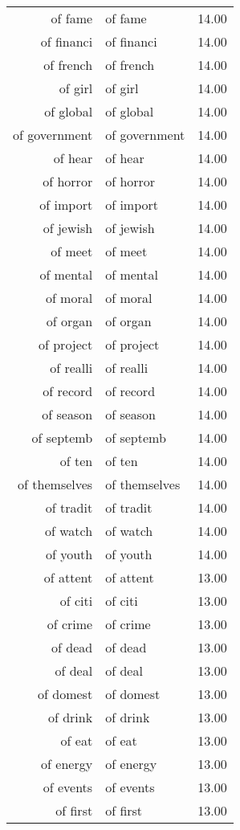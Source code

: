 \begin{table}[ht]
\begin{tabular}{rlr}
  of fame & of fame & 14.00 \\ 
  of financi & of financi & 14.00 \\ 
  of french & of french & 14.00 \\ 
  of girl & of girl & 14.00 \\ 
  of global & of global & 14.00 \\ 
  of government & of government & 14.00 \\ 
  of hear & of hear & 14.00 \\ 
  of horror & of horror & 14.00 \\ 
  of import & of import & 14.00 \\ 
  of jewish & of jewish & 14.00 \\ 
  of meet & of meet & 14.00 \\ 
  of mental & of mental & 14.00 \\ 
  of moral & of moral & 14.00 \\ 
  of organ & of organ & 14.00 \\ 
  of project & of project & 14.00 \\ 
  of realli & of realli & 14.00 \\ 
  of record & of record & 14.00 \\ 
  of season & of season & 14.00 \\ 
  of septemb & of septemb & 14.00 \\ 
  of ten & of ten & 14.00 \\ 
  of themselves & of themselves & 14.00 \\ 
  of tradit & of tradit & 14.00 \\ 
  of watch & of watch & 14.00 \\ 
  of youth & of youth & 14.00 \\ 
  of attent & of attent & 13.00 \\ 
  of citi & of citi & 13.00 \\ 
  of crime & of crime & 13.00 \\ 
  of dead & of dead & 13.00 \\ 
  of deal & of deal & 13.00 \\ 
  of domest & of domest & 13.00 \\ 
  of drink & of drink & 13.00 \\ 
  of eat & of eat & 13.00 \\ 
  of energy & of energy & 13.00 \\ 
  of events & of events & 13.00 \\ 
  of first & of first & 13.00 \\ 

\end{tabular}
\end{table}
